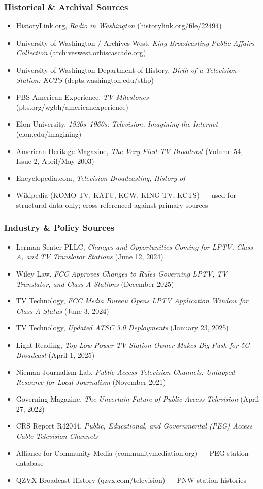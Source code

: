 \documentclass[11pt,letterpaper]{article}
\begin{document}
\subsubsection{Historical \& Archival Sources}
\begin{itemize}[leftmargin=2em]
  \item HistoryLink.org, \textit{Radio in Washington} (historylink.org/file/22494)
  \item University of Washington / Archives West, \textit{King Broadcasting Public Affairs Collection} (archiveswest.orbiscascade.org)
  \item University of Washington Department of History, \textit{Birth of a Television Station: KCTS} (depts.washington.edu/sthp)
  \item PBS American Experience, \textit{TV Milestones} (pbs.org/wgbh/americanexperience)
  \item Elon University, \textit{1920s--1960s: Television, Imagining the Internet} (elon.edu/imagining)
  \item American Heritage Magazine, \textit{The Very First TV Broadcast} (Volume 54, Issue 2, April/May 2003)
  \item Encyclopedia.com, \textit{Television Broadcasting, History of}
  \item Wikipedia (KOMO-TV, KATU, KGW, KING-TV, KCTS) --- used for structural data only; cross-referenced against primary sources
\end{itemize}

\subsubsection{Industry \& Policy Sources}
\begin{itemize}[leftmargin=2em]
  \item Lerman Senter PLLC, \textit{Changes and Opportunities Coming for LPTV, Class A, and TV Translator Stations} (June 12, 2024)
  \item Wiley Law, \textit{FCC Approves Changes to Rules Governing LPTV, TV Translator, and Class A Stations} (December 2025)
  \item TV Technology, \textit{FCC Media Bureau Opens LPTV Application Window for Class A Status} (June 3, 2024)
  \item TV Technology, \textit{Updated ATSC 3.0 Deployments} (January 23, 2025)
  \item Light Reading, \textit{Top Low-Power TV Station Owner Makes Big Push for 5G Broadcast} (April 1, 2025)
  \item Nieman Journalism Lab, \textit{Public Access Television Channels: Untapped Resource for Local Journalism} (November 2021)
  \item Governing Magazine, \textit{The Uncertain Future of Public Access Television} (April 27, 2022)
  \item CRS Report R42044, \textit{Public, Educational, and Governmental (PEG) Access Cable Television Channels}
  \item Alliance for Community Media (communitymediation.org) --- PEG station database
  \item QZVX Broadcast History (qzvx.com/television) --- PNW station histories
\end{itemize}
\end{document}
